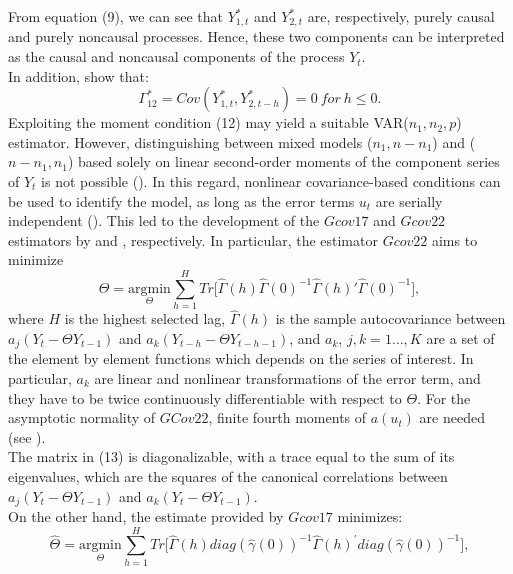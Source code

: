 \documentclass[<1p>]{elsarticle} %
\begin{document}
\indent From equation (9), we can see that $Y_{1,t}^*$ and $Y_{2,t}^*$ are, respectively, purely causal and purely noncausal processes. Hence, these two components can be interpreted as the causal and noncausal components of the process $Y_t$.\\
\indent In addition, \cite{gourieroux2017noncausal} show that:
\begin{equation}
\Gamma^{*}_{12}=Cov(Y_{1,t}^{*}, Y_{2,t-h}^{*})=0 \ for \ h \leq 0. 
\end{equation}
Exploiting the moment condition (12) may yield a suitable VAR($n_1, n_2, p$) estimator. However, distinguishing between mixed models ($n_{1}, n-n_{1}$) and ($n-n_{1},n_{1}$) based solely on linear second-order moments of the component series of $Y_t$ is not possible (\cite{gourieroux2017noncausal}). In this regard, nonlinear covariance-based conditions can be used to identify the model, as long as the error terms $u_t$ are serially independent (\cite{chan2006note}). This led to the development of the $Gcov17$ and $Gcov22$ estimators by \cite{gourieroux2017noncausal} and \cite{gourieroux2022generalized}, respectively. In particular, 
the estimator $Gcov22$ aims to minimize
\begin{equation}
	\hat{\Theta}= \underset{\Theta}{\mathrm{argmin}} \sum_{h=1}^{H} Tr \bigl[ \hat{\Gamma}(h) \hat{\Gamma}(0)^{-1}\hat{\Gamma}(h)' \hat{\Gamma}(0)^{-1} \bigr],
\end{equation}
where $H$ is the highest selected lag, $\hat{\Gamma}(h)$ is the sample autocovariance between $a_{j}(Y_{t} - \Theta Y_{t-1})$ and $a_{k}(Y_{t-h} - \Theta Y_{t-h-1})$, and $a_{k}$, $j,k=1 \dots, K$ are a set of the element by element functions which depends on the series of interest. In particular, $a_{k}$ are linear and nonlinear transformations of the error term, and they have to be twice continuously differentiable with respect to $\Theta$. For the asymptotic normality of $GCov22$, finite fourth moments of $a(u_t)$ are needed (see \cite{gourieroux2022generalized}).\\
\indent The matrix in (13) is diagonalizable, with a trace equal to the sum of its eigenvalues, which are the squares of the canonical correlations between $a_{j}(Y_{t} - \Theta Y_{t-1})$ and $a_{k}(Y_{t} - \Theta Y_{t-1})$.\\
\indent On the other hand, the estimate provided by $Gcov17$ minimizes:
\begin{equation}
	\hat{\Theta}= \underset{\Theta}{\mathrm{argmin}} \sum_{h=1}^{H} Tr \bigl[  \hat{\Gamma} (h)  
     diag(\hat{\gamma}(0))^{-1} 
  \hat{\Gamma}(h)^{\prime} 
     diag(\hat{\gamma}(0))^{-1} 
 \Bigr],
\end{equation}
\end{document}
